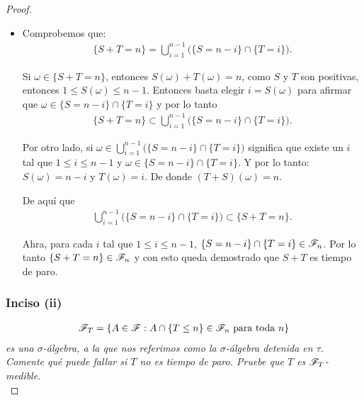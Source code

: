\begin{proof}
\begin{itemize}
				Por último, ${\{ T \leq n \} \in \F_n}$ y ${\{ S \leq n \} \in \F_n}$. Por lo tanto	\\	
				${\{ T \leq n \} \cap \{ S \leq n\} = \{ S \vee T \leq n \} \in \F_n}$ y con esto demostramos que 
				${ S \vee T}$ es tiempo de paro.\\
				
			\item
				Comprobemos que:
				\begin{align}
					\{ S + T = n \} = \bigcup_{i = 1}^{n-1} \bigg( \{S = n - i\} \cap \{T = i\} \bigg).
				\end{align}
				
				Si ${\omega \in \{ S + T = n \}}$, entonces ${S(\omega) + T(\omega) = n}$, como ${S}$ y ${T}$ son positivas,
				entonces ${1 \leq S(\omega) \leq n-1}$. Entonces basta elegir ${i = S(\omega)}$ para afirmar que 
				${\omega \in \{S = n - i\} \cap \{T = i\}}$ y por lo tanto
				\begin{align}
				\{ S + T = n \} \subset \bigcup_{i = 1}^{n-1} \bigg( \{S = n - i\} \cap \{T = i\} \bigg).
				\end{align}
				
				Por otro lado, si ${\omega \in \bigcup_{i = 1}^{n-1} \bigg( \{S = n - i\} \cap \{T = i\} \bigg)}$
				significa que existe un ${i}$ tal que ${1\leq i \leq n-1}$ y ${\omega \in \{S = n - i\} \cap \{T = i\}}$.
				Y por lo tanto: ${S(\omega) = n-i}$ y ${T(\omega) = i}$. De donde ${(T + S)(\omega) = n}$.
				
				De aquí que
				\begin{align}
					\bigcup_{i = 1}^{n-1} \bigg( \{S = n - i\} \cap \{T = i\} \bigg) \subset \{ S + T = n \}. 
				\end{align}
				
				Ahra, para cada ${i}$ tal que ${1 \leq i \leq n-1}$, ${\{S = n - i\} \cap \{T = i\} \in \mathscr{F}_n}$.
				Por lo tanto ${\{ S + T = n\} \in \mathscr{F}_n}$ y con esto queda demostrado que ${ S + T }$ es tiempo de paro.
		\end{itemize}
		
	\subsubsection{Inciso (ii)}
	\emph{
		\begin{align}
			\mathscr{F}_T=\left\{ A\in\mathscr{F}:A\cap\left\{ T\leq n\right\} \in\mathscr{F}_n\text{ para toda } n\right\} 
		\end{align}
		es una ${\sigma}$-\'algebra, 
		a la que nos referimos como la ${\sigma}$-\'algebra detenida en ${\tau}$. Comente qu\'e puede fallar si ${T}$ no es tiempo de paro. 
		Pruebe que ${T}$ es ${\mathscr{F}_T}$-medible.\\		
	}			
			

\end{proof}
